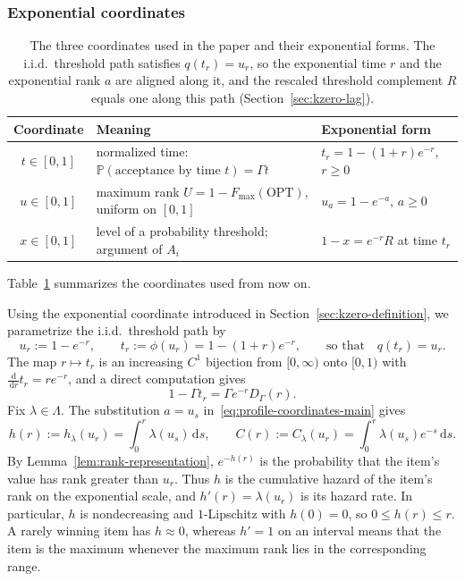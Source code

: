 \documentclass[11pt]{article}
\theoremstyle{definition}
\theoremstyle{remark}
\newcommand{\Pp}{\mathbb P}
\newcommand{\dd}{\,\mathrm d}
\newcommand{\OPT}{\mathrm{OPT}}
\begin{document}
\subsubsection{Exponential coordinates}\label{sec:kzero-exp}

\begin{table}[t]
\centering
\small
\begin{tabular}{@{}c l l@{}}
\toprule
Coordinate & Meaning & Exponential form\\
\midrule
$t\in[0,1]$ & normalized time: $\Pp(\text{acceptance by time }t)=\Gamma t$ & $t_r=1-(1+r)e^{-r}$, $r\ge0$\\
$u\in[0,1]$ & maximum rank $U=1-F_{\max}(\OPT)$, uniform on $[0,1]$ & $u_a=1-e^{-a}$, $a\ge0$\\
$x\in[0,1]$ & level of a probability threshold; argument of $A_i$ & $1-x=e^{-r}R$ at time $t_r$\\
\bottomrule
\end{tabular}
\caption{The three coordinates used in the paper and their exponential forms. The i.i.d.\
threshold path satisfies $q(t_r)=u_r$, so the exponential time $r$ and the exponential rank $a$
are aligned along it, and the rescaled threshold complement $R$ equals one along this path
(Section~\ref{sec:kzero-lag}).}
\label{tab:coordinates}
\end{table}

Table~\ref{tab:coordinates} summarizes the coordinates used from now on.

Using the exponential coordinate introduced in
Section~\ref{sec:kzero-definition}, we parametrize the i.i.d.\
threshold path by
\begin{equation}\label{eq:kzero-r-coordinates}
 u_r:=1-e^{-r},
 \qquad
 t_r:=\phi(u_r)=1-(1+r)e^{-r},
 \qquad\text{so that}\quad
 q(t_r)=u_r.
\end{equation}
The map $r\mapsto t_r$ is an increasing $C^1$ bijection from $[0,\infty)$ onto $[0,1)$ with $\frac{\dd}{\dd r}t_r=re^{-r}$, and a direct computation gives
\begin{equation}\label{eq:kzero-S}
 1-\Gamma t_r=\Gamma e^{-r}D_\Gamma(r).
\end{equation}
Fix $\lambda\in\Lambda$.
The substitution $a=u_s$ in~\eqref{eq:profile-coordinates-main} gives
\begin{equation}\label{eq:kzero-h}
 h(r):=h_\lambda(u_r)=\int_0^r\lambda(u_s)\dd s,
 \qquad
 C(r):=C_\lambda(u_r)=\int_0^r\lambda(u_s)e^{-s}\dd s.
\end{equation}
By Lemma~\ref{lem:rank-representation}, $e^{-h(r)}$ is the probability that the item's value has rank greater than $u_r$.
Thus $h$ is the cumulative hazard of the item's rank on the exponential scale, and $h'(r)=\lambda(u_r)$ is its hazard rate.
In particular, $h$ is nondecreasing and $1$-Lipschitz with $h(0)=0$, so $0\le h(r)\le r$.
A rarely winning item has $h\approx0$, whereas $h'=1$ on an interval means that the item is the maximum whenever the maximum rank lies in the corresponding range.
\end{document}
